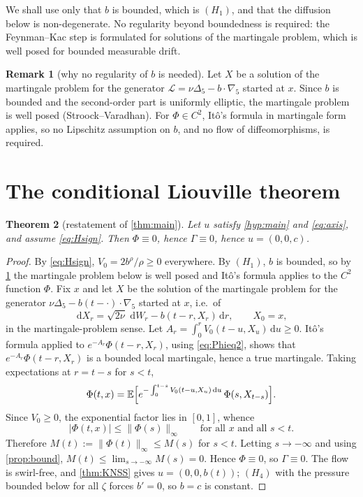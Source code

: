 \documentclass[11pt]{article}
\newtheorem{theorem}{Theorem}[section]
\theoremstyle{definition}
\newtheorem{remark}[theorem]{Remark}
\newcommand{\dd}{\,\mathrm{d}}
\begin{document}
We shall use only that $b$ is bounded, which is $(H_1)$, and that the diffusion
below is non-degenerate. No regularity beyond boundedness is required: the
Feynman--Kac step is formulated for solutions of the martingale problem, which
is well posed for bounded measurable drift.

\begin{remark}[why no regularity of $b$ is needed]\label{rem:noreg}
Let $X$ be a solution of the martingale problem for the generator
$\mathcal L=\nu\Delta_5-b\cdot\nabla_5$ started at $x$. Since $b$ is bounded
and the second-order part is uniformly elliptic, the martingale problem is
well posed (Stroock--Varadhan). For $\Phi\in C^2$, It\^o's formula in
martingale form applies, so no Lipschitz assumption on $b$, and no flow of
diffeomorphisms, is required.
\end{remark}

\section{The conditional Liouville theorem}

\begin{theorem}[restatement of \cref{thm:main}]\label{thm:main2}
Let $u$ satisfy \cref{hyp:main} and \eqref{eq:axis}, and assume
\eqref{eq:Hsign}. Then $\Phi\equiv0$, hence $\Gamma\equiv0$, hence
$u=(0,0,c)$.
\end{theorem}
\begin{proof}
By \eqref{eq:Hsign}, $V_0=2b^\rho/\rho\ge0$ everywhere. By $(H_1)$, $b$ is
bounded, so by \cref{rem:noreg} the martingale problem below is well posed and
It\^o's formula applies to the $C^2$ function $\Phi$. Fix
$x$ and let $X$ be the solution of the martingale problem for the generator
$\nu\Delta_5-b(t-\cdot)\cdot\nabla_5$ started at $x$, i.e.\ of
\begin{equation}\label{eq:SDE}
\dd X_r=\sqrt{2\nu}\,\dd W_r-b(t-r,X_r)\dd r,\qquad X_0=x,
\end{equation}
in the martingale-problem sense. Let
$A_r=\int_0^rV_0(t-u,X_u)\dd u\ge0$. It\^o's formula applied to
$e^{-A_r}\Phi(t-r,X_r)$, using \eqref{eq:Phieq2}, shows that
$e^{-A_r}\Phi(t-r,X_r)$ is a bounded local martingale, hence a true
martingale. Taking expectations at $r=t-s$ for $s<t$,
\begin{equation}\label{eq:FK}
\Phi(t,x)=\mathbb{E}\Bigl[e^{-\int_0^{t-s}V_0(t-u,X_u)\dd u}\,
\Phi(s,X_{t-s})\Bigr].
\end{equation}
Since $V_0\ge0$, the exponential factor lies in $[0,1]$, whence
\begin{equation}
|\Phi(t,x)|\le\|\Phi(s)\|_\infty
\qquad\text{for all }x\text{ and all }s<t .
\end{equation}
Therefore $M(t):=\|\Phi(t)\|_\infty\le M(s)$ for $s<t$. Letting
$s\to-\infty$ and using \cref{prop:bound}, $M(t)\le\lim_{s\to-\infty}M(s)=0$.
Hence $\Phi\equiv0$, so $\Gamma\equiv0$. The flow is swirl-free, and
\cref{thm:KNSS} gives $u=(0,0,b(t))$; $(H_4)$ with the pressure bounded below
for all $\zeta$ forces $b'=0$, so $b=c$ is constant.
\end{proof}
\end{document}
